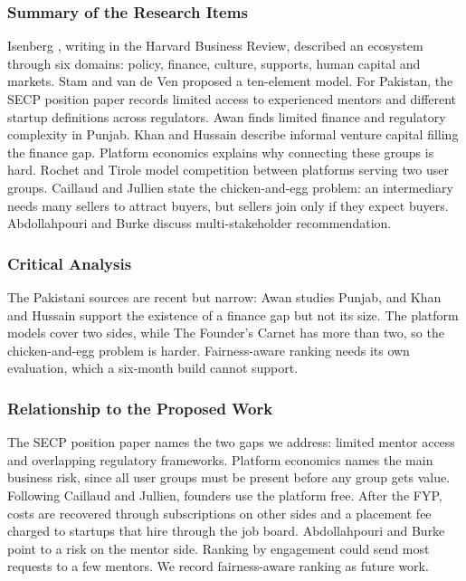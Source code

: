 \documentclass{FastFyp}
\begin{document}
\subsubsection{Summary of the Research Items}
Isenberg \cite{ref:isenberg2010}, writing in the Harvard Business Review, described an ecosystem through six domains: policy, finance, culture, supports, human capital and markets. Stam and van de Ven \cite{ref:stam2021} proposed a ten-element model. For Pakistan, the SECP position paper \cite{ref:secpposition} records limited access to experienced mentors and different startup definitions across regulators. Awan \cite{ref:awan2025} finds limited finance and regulatory complexity in Punjab. Khan and Hussain \cite{ref:khan2026informal} describe informal venture capital filling the finance gap. Platform economics explains why connecting these groups is hard. Rochet and Tirole \cite{ref:rochet2003} model competition between platforms serving two user groups. Caillaud and Jullien \cite{ref:caillaud2003} state the chicken-and-egg problem: an intermediary needs many sellers to attract buyers, but sellers join only if they expect buyers. Abdollahpouri and Burke \cite{ref:abdollahpouri2019} discuss multi-stakeholder recommendation.

\subsubsection{Critical Analysis}
The Pakistani sources are recent but narrow: Awan studies Punjab, and Khan and Hussain support the existence of a finance gap but not its size. The platform models cover two sides, while The Founder's Carnet has more than two, so the chicken-and-egg problem is harder. Fairness-aware ranking needs its own evaluation, which a six-month build cannot support.

\subsubsection{Relationship to the Proposed Work}
The SECP position paper names the two gaps we address: limited mentor access and overlapping regulatory frameworks. Platform economics names the main business risk, since all user groups must be present before any group gets value. Following Caillaud and Jullien, founders use the platform free. After the FYP, costs are recovered through subscriptions on other sides and a placement fee charged to startups that hire through the job board. Abdollahpouri and Burke point to a risk on the mentor side. Ranking by engagement could send most requests to a few mentors. We record fairness-aware ranking as future work.
\end{document}
